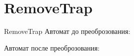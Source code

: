 \section{RemoveTrap}
\begin{frame}{RemoveTrap}
	Автомат до преоброзования:


	Автомат после преоброзования:


\end{frame}
